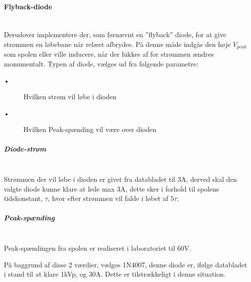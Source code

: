 \paragraph{Flyback-diode} \hspace{0pt} \\
Derudover implementere der, som førnævnt en ”flyback” diode, for at give strømmen en løbebane når relæet afbrydes. På denne måde indgås den høje $V_{peak}$ som spolen eller ville inducere, når der lukkes af for strømmen ændres monumentalt. Typen af diode, vælges ud fra følgende parametre:


\begin{description}
 \item[•] Hvilken strøm vil løbe i dioden
 \item[•] Hvilken Peak-spænding vil være over dioden
\end{description}

\subparagraph{Diode-strøm} \hspace{0pt} \\
Strømmen der vil løbe i dioden er givet fra databladet til  3A, derved skal den valgte diode kunne klare at lede max 3A, dette sker i forhold til spolens tidskonstant, $\tau$, hvor efter strømmen vil falde i løbet af $ 5 \tau$.

\subparagraph{Peak-spænding} \hspace{0pt} \\
Peak-spændingen fra spolen er realiseret i laboratoriet til 60V. 

På baggrund af disse 2 værdier, vælges 1N4007, denne diode er, ifølge databladet i stand til at klare 1kVp, og 30A. Dette er tilstrækkeligt i denne situation.
